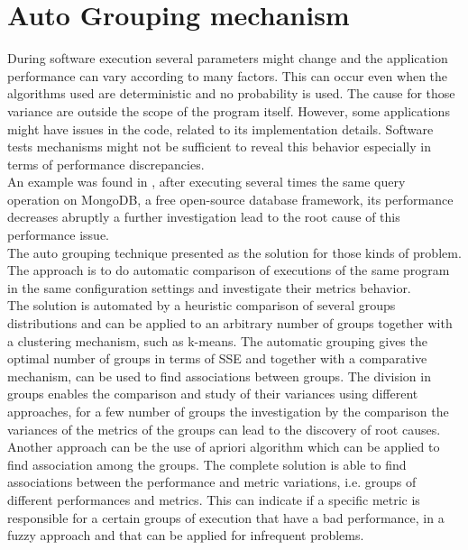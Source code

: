\section{Auto Grouping mechanism}
During software execution several parameters might change and the application performance can vary according to many factors. This can occur even when the algorithms used are deterministic and no probability is used. The cause for those variance are outside the scope of the program itself.
However, some applications might have issues in the code, related to its implementation details. Software tests mechanisms might not be sufficient to reveal this behavior especially in terms of performance discrepancies.\\
An example was found in \cite{doray_article}, after executing several times the same query operation on MongoDB, a free open-source database framework, its performance decreases abruptly a further investigation lead to the root cause of this performance issue. \\
The auto grouping technique presented as the solution for those kinds of problem. The approach is to do automatic comparison of executions of the same program in the same configuration settings and investigate their metrics behavior. \\
The solution is automated by a heuristic comparison of several groups distributions and can be applied to an arbitrary number of groups together with a clustering mechanism, such as k-means. The automatic grouping gives the optimal number of groups in terms of SSE and together with a comparative mechanism, can be used to find associations between groups. 
The division in groups enables the comparison and study of their variances using different approaches, for a few number of groups the investigation by the comparison the variances of the metrics of the groups can lead to the discovery of root causes. Another approach can be the use of apriori algorithm which can be applied to find association among the groups. 
The complete solution is able to find associations between the performance and metric variations, i.e. groups of different performances and metrics. This can indicate if a specific metric is responsible for a certain groups of execution that have a bad performance, in a fuzzy approach and that can be applied for infrequent problems.\\
